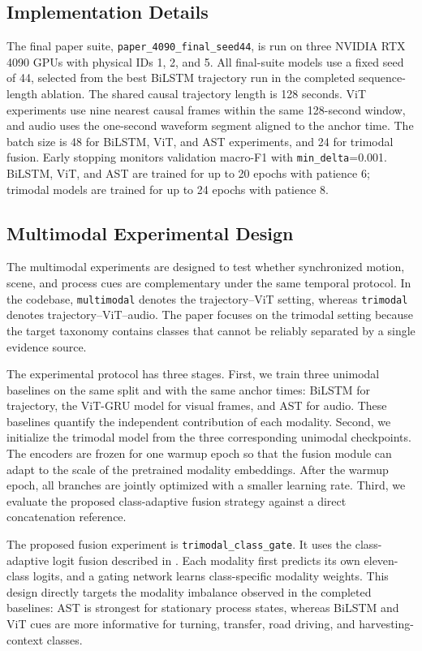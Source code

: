 \subsection{Implementation Details}

The final paper suite, \texttt{paper\_4090\_final\_seed44}, is run on three NVIDIA RTX 4090 GPUs with physical IDs 1, 2, and 5. All final-suite models use a fixed seed of 44, selected from the best BiLSTM trajectory run in the completed sequence-length ablation. The shared causal trajectory length is 128 seconds. ViT experiments use nine nearest causal frames within the same 128-second window, and audio uses the one-second waveform segment aligned to the anchor time. The batch size is 48 for BiLSTM, ViT, and AST experiments, and 24 for trimodal fusion. Early stopping monitors validation macro-F1 with \texttt{min\_delta}=0.001. BiLSTM, ViT, and AST are trained for up to 20 epochs with patience 6; trimodal models are trained for up to 24 epochs with patience 8.

\subsection{Multimodal Experimental Design}
\label{sec:multimodal_design}

The multimodal experiments are designed to test whether synchronized motion, scene, and process cues are complementary under the same temporal protocol. In the codebase, \texttt{multimodal} denotes the trajectory--ViT setting, whereas \texttt{trimodal} denotes trajectory--ViT--audio. The paper focuses on the trimodal setting because the target taxonomy contains classes that cannot be reliably separated by a single evidence source.

The experimental protocol has three stages. First, we train three unimodal baselines on the same split and with the same anchor times: BiLSTM for trajectory, the ViT-GRU model for visual frames, and AST for audio. These baselines quantify the independent contribution of each modality. Second, we initialize the trimodal model from the three corresponding unimodal checkpoints. The encoders are frozen for one warmup epoch so that the fusion module can adapt to the scale of the pretrained modality embeddings. After the warmup epoch, all branches are jointly optimized with a smaller learning rate. Third, we evaluate the proposed class-adaptive fusion strategy against a direct concatenation reference.

The proposed fusion experiment is \texttt{trimodal\_class\_gate}. It uses the class-adaptive logit fusion described in . Each modality first predicts its own eleven-class logits, and a gating network learns class-specific modality weights. This design directly targets the modality imbalance observed in the completed baselines: AST is strongest for stationary process states, whereas BiLSTM and ViT cues are more informative for turning, transfer, road driving, and harvesting-context classes.

